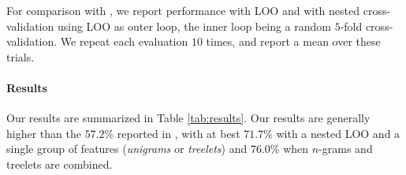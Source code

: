 \documentclass[11pt,letterpaper]{article}
\begin{document}
For comparison with , we report performance with LOO and with nested cross-validation using 
LOO as outer loop, the inner loop being a random $5$-fold cross-validation.
We repeat each evaluation $10$ times, and report a mean over these trials.


\begin{table}[t!]
%
    \caption{Results (accuracy, in \%).}%
    \label{tab:results}
\end{table}


\paragraph{Results}

Our results are summarized in Table \ref{tab:results}.
Our results are generally higher than the $57.2$\% reported in \cite{markowitz_linguistic_2015}, with at best $71.7$\% with a nested LOO and a single group of features (\textit{unigrams} or \textit{treelets}) and $76.0$\% when $n$-grams and treelets are combined.
\end{document}
